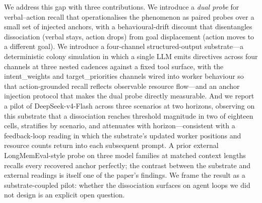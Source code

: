 We address this gap with three contributions. We introduce a
\emph{dual probe} for verbal--action recall that operationalises
the phenomenon as paired probes over a small set of injected
anchors, with a behavioural-drift discount that disentangles
dissociation (verbal stays, action drops) from goal displacement
(action moves to a different goal). We introduce a four-channel
structured-output substrate---a deterministic colony simulation in
which a single LLM emits directives across four channels at three
nested cadences against a fixed tool surface, with the
\textsf{intent\_weights} and \textsf{target\_priorities} channels
wired into worker behaviour so that action-grounded recall reflects
observable resource flow---and an anchor injection protocol that
makes the dual probe directly measurable. And we report a pilot
of DeepSeek-v4-Flash across three scenarios at two horizons,
observing on this substrate that a dissociation reaches threshold
magnitude in two of eighteen cells, stratifies by scenario, and
attenuates with horizon---consistent with a feedback-loop reading
in which the substrate's updated worker positions and resource
counts return into each subsequent prompt. A prior external
LongMemEval-style probe on three model families at matched context
lengths recalls every recovered anchor perfectly; the contrast
between the substrate and external readings is itself one of the
paper's findings. We frame the result as a
substrate-coupled pilot: whether the dissociation surfaces on
agent loops we did not design is an explicit open question.
